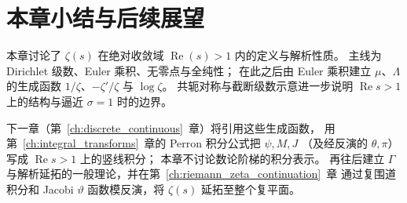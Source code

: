 \section*{本章小结与后续展望}

本章讨论了 $\zeta(s)$ 在绝对收敛域 $\operatorname{Re}(s)>1$ 内的定义与解析性质。
主线为 Dirichlet 级数、Euler 乘积、无零点与全纯性；
在此之后由 Euler 乘积建立 $\mu$、$\Lambda$ 的生成函数
$1/\zeta$、$-\zeta'/\zeta$ 与 $\log\zeta$。
共轭对称与截断级数示意进一步说明 $\operatorname{Re}s>1$ 上的结构与逼近 $\sigma=1$ 时的边界。

下一章（第~\ref{ch:discrete_continuous}~章）将引用这些生成函数，
用第~\ref{ch:integral_transforms}~章的 Perron 积分公式把 $\psi,M,J$
（及经反演的 $\theta,\pi$）写成 $\operatorname{Re}s>1$ 上的竖线积分；
本章不讨论数论阶梯的积分表示。
再往后建立 $\Gamma$ 与解析延拓的一般理论，并在第~\ref{ch:riemann_zeta_continuation}~章
通过复围道积分和 Jacobi $\vartheta$ 函数模反演，将 $\zeta(s)$ 延拓至整个复平面。